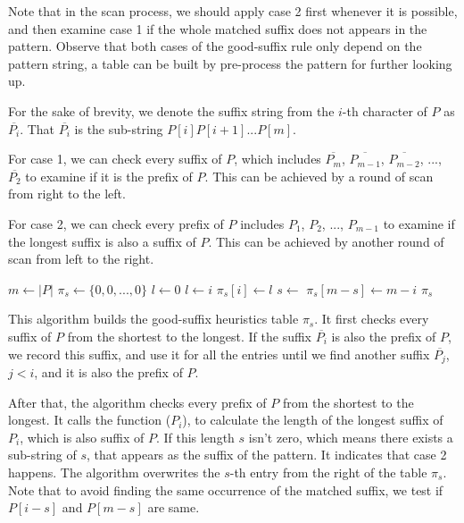 \documentclass[UTF8]{article}
\begin{document}
Note that in the scan process, we should apply case 2 first whenever it is possible, and then
examine case 1 if the whole matched suffix does not appears in the pattern. Observe that
both cases of the good-suffix rule only depend on the pattern string, a table can be
built by pre-process the pattern for further looking up.

For the sake of brevity, we denote the suffix string from the $i$-th character
of $P$ as $\overline{P_i}$. That $\overline{P_i}$ is the sub-string $P[i]P[i+1]...P[m]$.

For case 1, we can check every suffix of $P$, which includes $\overline{P_m}$, $\overline{P_{m-1}}$, $\overline{P_{m-2}}$, ...,  $\overline{P_2}$ to examine if it is the prefix of $P$.
This can be achieved by a round of scan from right to the left.

For case 2, we can check every prefix of $P$ includes $P_1$, $P_2$, ..., $P_{m-1}$ to examine if the longest suffix is also a suffix of $P$. This can be achieved by another
round of scan from left to the right.

\begin{algorithmic}[1]
  \State $m \gets |P|$
  \State $\pi_s \gets \{0, 0, ..., 0\}$ 
  \State $l \gets 0$ 
   
     
      \State $l \gets i$
    \EndIf
    \State $\pi_s[i] \gets l$
  \EndFor
   
    \State $s \gets$ 
      \State $\pi_s[m - s] \gets m - i$
    \EndIf
  \EndFor
  \State \Return $\pi_s$
\EndFunction
\end{algorithmic}

This algorithm builds the good-suffix heuristics table $\pi_s$. It first checks every
suffix of $P$ from the shortest to the longest. If the suffix $\overline{P_i}$ is also the prefix of $P$, we record
this suffix, and use it for all the entries until we find another suffix $\overline{P_j}$, $j < i$, and it is also the prefix of $P$.

After that, the algorithm checks every prefix of $P$ from the shortest to the longest. It calls
the function ($P_i$), to calculate the length of the longest suffix
of $P_i$, which is also suffix of $P$. If this length $s$ isn't zero, which means there
exists a sub-string of $s$, that appears as the suffix of the pattern. It indicates that
case 2 happens. The algorithm overwrites the $s$-th entry from the right
of the table $\pi_s$. Note that to avoid finding the same occurrence of the matched suffix,
we test if $P[i - s]$ and $P[m - s]$ are same.
\end{document}

